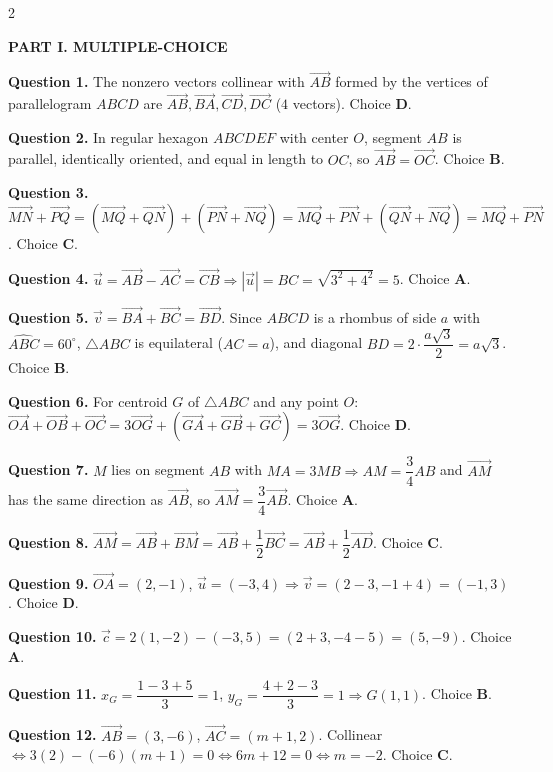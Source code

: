 \documentclass[10pt,a4paper]{article}
\begin{document}
\begin{multicols}{2}
\raggedcolumns
\small

\textbf{\color{accent}PART I. MULTIPLE-CHOICE}

\textbf{Question 1.} The nonzero vectors collinear with $\vec{AB}$ formed by the vertices of parallelogram $ABCD$ are $\vec{AB}, \vec{BA}, \vec{CD}, \vec{DC}$ ($4$ vectors). Choice \textbf{D}.

\textbf{Question 2.} In regular hexagon $ABCDEF$ with center $O$, segment $AB$ is parallel, identically oriented, and equal in length to $OC$, so $\vec{AB} = \vec{OC}$. Choice \textbf{B}.

\textbf{Question 3.} $\vec{MN} + \vec{PQ} = (\vec{MQ} + \vec{QN}) + (\vec{PN} + \vec{NQ}) = \vec{MQ} + \vec{PN} + (\vec{QN} + \vec{NQ}) = \vec{MQ} + \vec{PN}$. Choice \textbf{C}.

\textbf{Question 4.} $\vec{u} = \vec{AB} - \vec{AC} = \vec{CB} \Rightarrow |\vec{u}| = BC = \sqrt{3^2 + 4^2} = 5$. Choice \textbf{A}.

\textbf{Question 5.} $\vec{v} = \vec{BA} + \vec{BC} = \vec{BD}$. Since $ABCD$ is a rhombus of side $a$ with $\widehat{ABC} = 60^\circ$, $\triangle ABC$ is equilateral ($AC = a$), and diagonal $BD = 2 \cdot \dfrac{a\sqrt{3}}{2} = a\sqrt{3}$. Choice \textbf{B}.

\textbf{Question 6.} For centroid $G$ of $\triangle ABC$ and any point $O$: $\vec{OA} + \vec{OB} + \vec{OC} = 3\vec{OG} + (\vec{GA} + \vec{GB} + \vec{GC}) = 3\vec{OG}$. Choice \textbf{D}.

\textbf{Question 7.} $M$ lies on segment $AB$ with $MA = 3MB \Rightarrow AM = \dfrac{3}{4}AB$ and $\vec{AM}$ has the same direction as $\vec{AB}$, so $\vec{AM} = \dfrac{3}{4}\vec{AB}$. Choice \textbf{A}.

\textbf{Question 8.} $\vec{AM} = \vec{AB} + \vec{BM} = \vec{AB} + \dfrac{1}{2}\vec{BC} = \vec{AB} + \dfrac{1}{2}\vec{AD}$. Choice \textbf{C}.

\textbf{Question 9.} $\vec{OA} = (2, -1)$, $\vec{u} = (-3, 4) \Rightarrow \vec{v} = (2 - 3, -1 + 4) = (-1, 3)$. Choice \textbf{D}.

\textbf{Question 10.} $\vec{c} = 2(1, -2) - (-3, 5) = (2 + 3, -4 - 5) = (5, -9)$. Choice \textbf{A}.

\textbf{Question 11.} $x_G = \dfrac{1 - 3 + 5}{3} = 1$, $y_G = \dfrac{4 + 2 - 3}{3} = 1 \Rightarrow G(1, 1)$. Choice \textbf{B}.

\textbf{Question 12.} $\vec{AB} = (3, -6)$, $\vec{AC} = (m + 1, 2)$. Collinear $\Leftrightarrow 3(2) - (-6)(m + 1) = 0 \Leftrightarrow 6m + 12 = 0 \Leftrightarrow m = -2$. Choice \textbf{C}.


\end{multicols}
\end{document}

